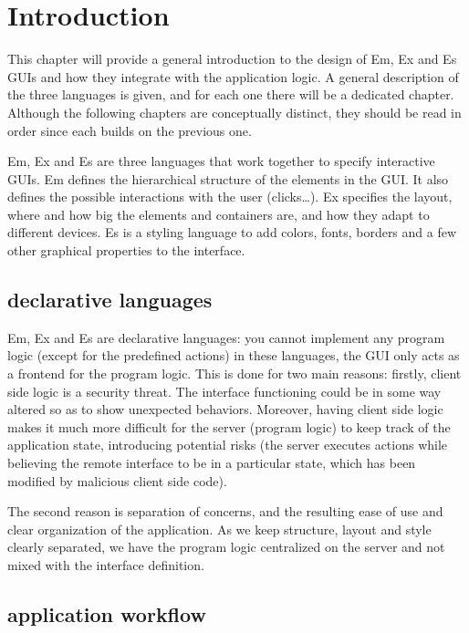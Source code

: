 
\section{Introduction}

This chapter will provide a general introduction to the design of Em, Ex and Es GUIs and how they integrate with the application logic. A general description of the three languages is given, and for each one there will be a dedicated chapter. Although the following chapters are conceptually distinct, they should be read in order since each builds on the previous one.

Em, Ex and Es are three languages that work together to specify interactive GUIs. Em defines the hierarchical structure of the elements in the GUI. It also defines the possible interactions with the user (clicks\ldots). Ex specifies the layout, where and how big the elements and containers are, and how they adapt to different devices. Es is a styling language to add colors, fonts, borders and a few other graphical properties to the interface.

\subsection{declarative languages}
\label{design:declarative_languages}
Em, Ex and Es are declarative languages: you cannot implement any program logic (except for the predefined actions) in these languages, the GUI only acts as a frontend for the program logic. This is done for two main reasons: firstly, client side logic is a security threat. The interface functioning could be in some way altered so as to show unexpected behaviors. Moreover, having client side logic makes it much more difficult for the server (program logic) to keep track of the application state, introducing potential risks (the server executes actions while believing the remote interface to be in a particular state, which has been modified by malicious client side code).

The second reason is separation of concerns, and the resulting ease of use and clear organization of the application. As we keep structure, layout and style clearly separated, we have the program logic centralized on the server and not mixed with the interface definition.

\subsection{application workflow}

